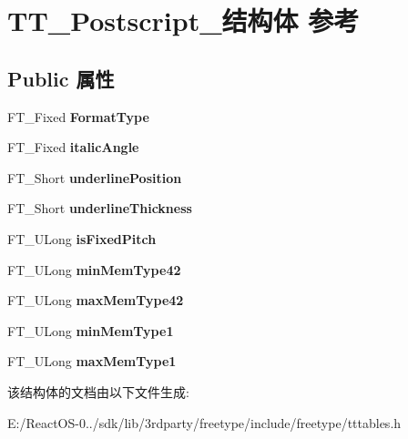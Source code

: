 \hypertarget{struct_t_t___postscript__}{}\section{T\+T\+\_\+\+Postscript\+\_\+结构体 参考}
\label{struct_t_t___postscript__}
\subsection*{Public 属性}
\begin{DoxyCompactItemize}
\item 
\mbox{\label{struct_t_t___postscript___a5ed6585c01fa4ffc3f8537d58bdd955f}} 
F\+T\+\_\+\+Fixed {\bfseries Format\+Type}
\item 
\mbox{\label{struct_t_t___postscript___adcca36c7fbcbdff00fc8c2884a215830}} 
F\+T\+\_\+\+Fixed {\bfseries italic\+Angle}
\item 
\mbox{\label{struct_t_t___postscript___a909fd5064ab7547bb8ed984b5dfe2fe2}} 
F\+T\+\_\+\+Short {\bfseries underline\+Position}
\item 
\mbox{\label{struct_t_t___postscript___a4e4654766a4f27054c9a35958515e186}} 
F\+T\+\_\+\+Short {\bfseries underline\+Thickness}
\item 
\mbox{\label{struct_t_t___postscript___ab9a537994be4f81cb35f61f83cd97949}} 
F\+T\+\_\+\+U\+Long {\bfseries is\+Fixed\+Pitch}
\item 
\mbox{\label{struct_t_t___postscript___ad78af4931654c197d4a8d0f04d473885}} 
F\+T\+\_\+\+U\+Long {\bfseries min\+Mem\+Type42}
\item 
\mbox{\label{struct_t_t___postscript___a70c4ba372d04e686208f0fede9885314}} 
F\+T\+\_\+\+U\+Long {\bfseries max\+Mem\+Type42}
\item 
\mbox{\label{struct_t_t___postscript___a91a8b40f60e67a1920209e6b08355848}} 
F\+T\+\_\+\+U\+Long {\bfseries min\+Mem\+Type1}
\item 
\mbox{\label{struct_t_t___postscript___a944a3df5127262db0f7ae92868defb99}} 
F\+T\+\_\+\+U\+Long {\bfseries max\+Mem\+Type1}
\end{DoxyCompactItemize}


该结构体的文档由以下文件生成\+:\begin{DoxyCompactItemize}
\item 
E\+:/\+React\+O\+S-\/0../sdk/lib/3rdparty/freetype/include/freetype/tttables.\+h\end{DoxyCompactItemize}
